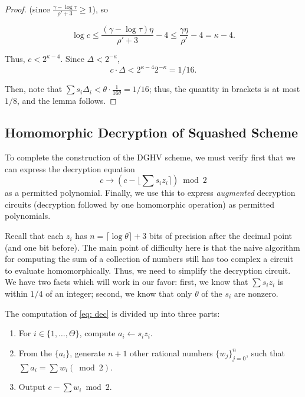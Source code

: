 \begin{proof}
    (since $\frac{\gamma - \log \tau}{\rho' + 3} \geq 1$),
    so

    \[\log c \leq \frac{(\gamma - \log \tau) \eta}{\rho' + 3} - 4 \leq \frac{\gamma \eta}{\rho'} - 4 = \kappa - 4.\]

    Thus, $c < 2^{\kappa - 4}$. Since $\Delta < 2^{-\kappa}$,
    \[c \cdot \Delta < 2^{\kappa - 4} 2^{-\kappa} = 1/16.\]

    Then, note that $\sum s_i \Delta_i < \theta \cdot \frac{1}{16 \theta} = 1/16$; thus, the quantity in brackets is at most $1/8$, and the lemma follows. %

\end{proof}

\subsection{Homomorphic Decryption of Squashed Scheme} \label{sec:dghvsquash}
To complete the construction of the DGHV scheme, we must verify first that we can express the decryption equation
\begin{equation} \label{eq: dec}
    c \to (c - \lfloor \sum s_i z_i \rceil) \bmod 2
\end{equation} as a permitted polynomial. Finally, we
use this to express \emph{augmented} decryption circuits (decryption followed by one homomorphic operation) as permitted polynomials.



Recall that each $z_i$ has $n = \lceil \log \theta \rceil + 3$ bits of precision after the decimal point (and one bit before). The main point of difficulty here is that the naive algorithm for computing the sum of a collection of numbers still has too complex a circuit to evaluate homomorphically. Thus, we need to simplify the decryption circuit. We have two facts which will work in our favor: first, we know that $\sum s_i z_i$ is within $1/4$ of an integer; second, we know that only $\theta$ of the $s_i$ are nonzero.

The computation of \ref{eq: dec} is divided up into three parts:
\begin{enumerate}
    \item For $i \in \{1, \dots, \Theta\}$, compute $a_i \leftarrow s_i z_i$.
    \item From the $\{a_i\}$, generate $n + 1$ other rational numbers $\{w_j\}_{j = 0}^n$, such that $\sum a_i = \sum w_i (\bmod 2)$.
    \item Output $c - \sum w_i \bmod 2$.
\end{enumerate}

